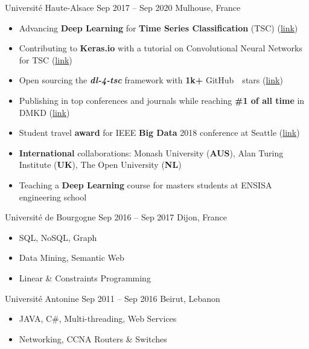 
 {Université Haute-Alsace}  {Sep 2017 -- Sep 2020} {Mulhouse, France} 

\begin{itemize}
    \item Advancing \textbf{Deep Learning} for \textbf{Time Series Classification} (TSC) (\href{https://github.com/hfawaz/}{link})
    \item Contributing to \textbf{Keras.io} with a tutorial on Convolutional Neural Networks for TSC (\href{https://keras.io/examples/timeseries/timeseries_classification_from_scratch/}{link})
    \item Open sourcing the \textbf{\textit{dl-4-tsc}} framework with \textbf{1k+} GitHub~\githubsymbol~stars (\href{https://github.com/hfawaz/dl-4-tsc/}{link})
    \item Publishing in top conferences and journals while reaching \textbf{\#1 of all time} in DMKD (\href{https://scholar.google.com/citations?hl=en&vq=eng_datamininganalysis&view_op=list_hcore&venue=35Y8BTagp0QJ.2022}{link})
    \item Student travel \textbf{award} for IEEE \textbf{Big Data} 2018 conference at Seattle (\href{http://cci.drexel.edu/bigdata/bigdata2018/StudentTravelAward.html}{link})
    \item \textbf{International} collaborations: Monash University (\textbf{AUS}), Alan Turing Institute (\textbf{UK}), The Open University (\textbf{NL})
    \item Teaching a \textbf{Deep Learning} course for masters students at ENSISA engineering school
\end{itemize}

\divider

 {Université de Bourgogne} {Sep 2016 -- Sep 2017} {Dijon, France} 
\begin{itemize}
    \item SQL, NoSQL, Graph
    \item Data Mining, Semantic Web
    \item Linear \& Constraints Programming
\end{itemize}

\divider

 {Université Antonine} {Sep 2011 -- Sep 2016} {Beirut, Lebanon} 
\begin{itemize}
    \item JAVA, C\#, Multi-threading, Web Services
    \item Networking, CCNA Routers \& Switches
\end{itemize}

